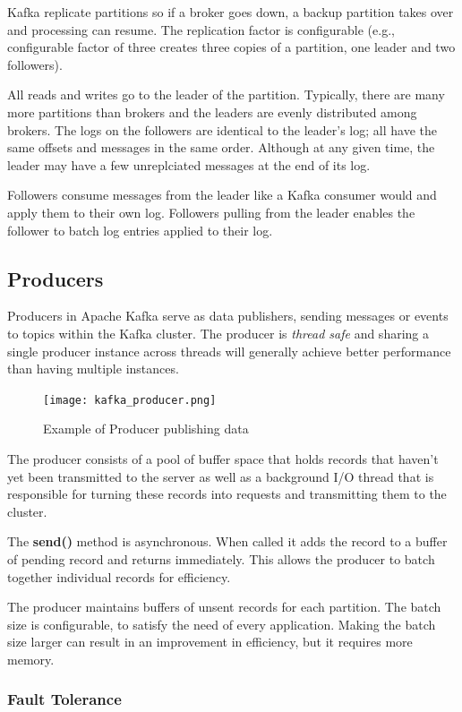 Kafka replicate partitions so if a broker goes down, a backup partition takes
over and processing can resume. The replication factor is configurable
(e.g., configurable factor of three creates three copies of a partition, one
leader and two followers).

All reads and writes go to the leader of the partition. Typically, there are
many more partitions than brokers and the leaders are evenly distributed among
brokers. The logs on the followers are identical to the leader's log; all have
the same offsets and messages in the same order. Although at any given time,
the leader may have a few unreplciated messages at the end of its log.

Followers consume messages from the leader like a Kafka consumer would and
apply them to their own log. Followers pulling from the leader enables the
follower to batch log entries applied to their log.

\subsection{Producers}

Producers in Apache Kafka serve as data publishers, sending messages or events
to topics within the Kafka cluster.
The producer is \textit{thread safe} and sharing a single producer instance
across threads will generally achieve better performance than having multiple
instances.

\begin{figure}[ht]
    \centering
    \texttt{[image: kafka\_producer.png]}
    \caption{Example of Producer publishing data}
\end{figure}

The producer consists of a pool of buffer space that holds records that haven't
yet been transmitted to the server as well as a background I/O thread that is
responsible for turning these records into requests and transmitting them to
the cluster.

The \textbf{send()} method is asynchronous. When called it adds the record to a
buffer of pending record and returns immediately. This allows the producer to
batch together individual records for efficiency.

The producer maintains buffers of unsent records for each partition. The batch
size is configurable, to satisfy the need of every application. Making the
batch size larger can result in an improvement in efficiency, but it requires
more memory.

\subsubsection{Fault Tolerance}

